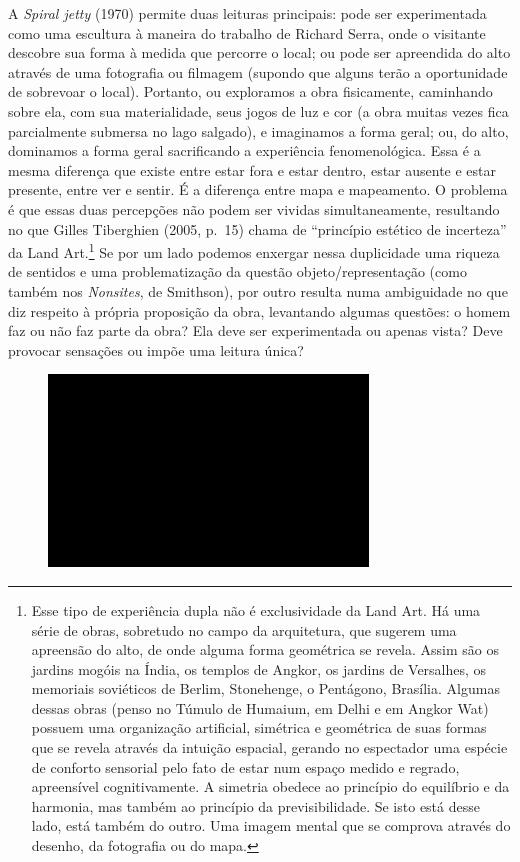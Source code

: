 A \emph{Spiral jetty} (1970) permite duas leituras principais: pode ser experimentada
como uma escultura à maneira do trabalho de Richard Serra, onde o
visitante descobre sua forma à medida que percorre o local; ou pode ser
apreendida do alto através de uma fotografia ou filmagem (supondo que
alguns terão a oportunidade de sobrevoar o local). Portanto, ou
exploramos a obra fisicamente, caminhando sobre ela, com sua
materialidade, seus jogos de luz e cor (a obra muitas vezes fica
parcialmente submersa no lago salgado), e imaginamos a forma geral; ou,
do alto, dominamos a forma geral sacrificando a experiência
fenomenológica. Essa é a mesma diferença que existe entre estar fora e
estar dentro, estar ausente e estar presente, entre ver e sentir. É a
diferença entre mapa e mapeamento. O problema é que essas duas
percepções não podem ser vividas simultaneamente, resultando no que
Gilles Tiberghien (2005, p.~15) chama de ``princípio estético de
incerteza'' da Land Art.\footnote{Esse tipo de experiência dupla não é
  exclusividade da Land Art. Há uma série de obras, sobretudo no campo
  da arquitetura, que sugerem uma apreensão do alto, de onde alguma
  forma geométrica se revela. Assim são os jardins mogóis na Índia, os
  templos de Angkor, os jardins de Versalhes, os memoriais soviéticos de
  Berlim, Stonehenge, o Pentágono, Brasília. Algumas dessas obras (penso
  no Túmulo de Humaium, em Delhi e em Angkor Wat) possuem uma
  organização artificial, simétrica e geométrica de suas formas que se
  revela através da intuição espacial, gerando no espectador uma espécie
  de conforto sensorial pelo fato de estar num espaço medido e regrado,
  apreensível cognitivamente. A simetria obedece ao princípio do
  equilíbrio e da harmonia, mas também ao princípio da previsibilidade.
  Se isto está desse lado, está também do outro. Uma imagem mental que
  se comprova através do desenho, da fotografia ou do mapa.} Se por um
lado podemos enxergar nessa duplicidade uma riqueza de sentidos e uma
problematização da questão objeto/representação (como também nos
\emph{Nonsites}, de Smithson), por outro resulta numa ambiguidade no que
diz respeito à própria proposição da obra, levantando algumas questões:
o homem faz ou não faz parte da obra? Ela deve ser experimentada ou
apenas vista? Deve provocar sensações ou impõe uma leitura única?

\begin{figure}[!ht]

\centering
 \includegraphics[width=85mm]{./imgs/im1.jpg}
\caption{\tiny{}}

\end{figure}

